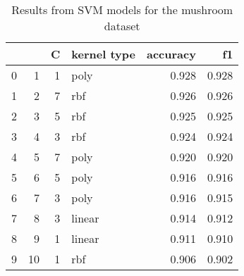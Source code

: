 \begin{table}
\centering
\caption{Results from SVM models for the mushroom dataset}
\begin{tabular}{lrrlrr}
\toprule
 &  & C & kernel type & accuracy & f1 \\
\midrule
0 & 1 & 1 & poly & 0.928 & 0.928 \\
1 & 2 & 7 & rbf & 0.926 & 0.926 \\
2 & 3 & 5 & rbf & 0.925 & 0.925 \\
3 & 4 & 3 & rbf & 0.924 & 0.924 \\
4 & 5 & 7 & poly & 0.920 & 0.920 \\
5 & 6 & 5 & poly & 0.916 & 0.916 \\
6 & 7 & 3 & poly & 0.916 & 0.915 \\
7 & 8 & 3 & linear & 0.914 & 0.912 \\
8 & 9 & 1 & linear & 0.911 & 0.910 \\
9 & 10 & 1 & rbf & 0.906 & 0.902 \\
\bottomrule
\end{tabular}
\end{table}
